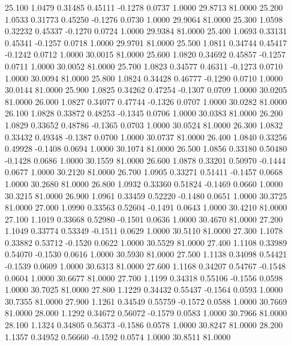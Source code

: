   25.100   1.0479   0.31485   0.45111  -0.1278   0.0737   1.0000  29.8713  81.0000
  25.200   1.0533   0.31773   0.45250  -0.1276   0.0730   1.0000  29.9064  81.0000
  25.300   1.0598   0.32232   0.45337  -0.1270   0.0724   1.0000  29.9384  81.0000
  25.400   1.0693   0.33131   0.45341  -0.1257   0.0718   1.0000  29.9701  81.0000
  25.500   1.0811   0.34744   0.45417  -0.1242   0.0712   1.0000  30.0015  81.0000
  25.600   1.0820   0.34692   0.45857  -0.1257   0.0711   1.0000  30.0052  81.0000
  25.700   1.0823   0.34577   0.46311  -0.1273   0.0710   1.0000  30.0094  81.0000
  25.800   1.0824   0.34428   0.46777  -0.1290   0.0710   1.0000  30.0144  81.0000
  25.900   1.0825   0.34262   0.47254  -0.1307   0.0709   1.0000  30.0205  81.0000
  26.000   1.0827   0.34077   0.47744  -0.1326   0.0707   1.0000  30.0282  81.0000
  26.100   1.0828   0.33872   0.48253  -0.1345   0.0706   1.0000  30.0383  81.0000
  26.200   1.0829   0.33652   0.48786  -0.1365   0.0703   1.0000  30.0524  81.0000
  26.300   1.0832   0.33432   0.49348  -0.1387   0.0700   1.0000  30.0737  81.0000
  26.400   1.0840   0.33256   0.49928  -0.1408   0.0694   1.0000  30.1074  81.0000
  26.500   1.0856   0.33180   0.50480  -0.1428   0.0686   1.0000  30.1559  81.0000
  26.600   1.0878   0.33201   0.50970  -0.1444   0.0677   1.0000  30.2120  81.0000
  26.700   1.0905   0.33271   0.51411  -0.1457   0.0668   1.0000  30.2680  81.0000
  26.800   1.0932   0.33360   0.51824  -0.1469   0.0660   1.0000  30.3215  81.0000
  26.900   1.0961   0.33459   0.52220  -0.1480   0.0651   1.0000  30.3725  81.0000
  27.000   1.0990   0.33563   0.52604  -0.1491   0.0643   1.0000  30.4210  81.0000
  27.100   1.1019   0.33668   0.52980  -0.1501   0.0636   1.0000  30.4670  81.0000
  27.200   1.1049   0.33774   0.53349  -0.1511   0.0629   1.0000  30.5110  81.0000
  27.300   1.1078   0.33882   0.53712  -0.1520   0.0622   1.0000  30.5529  81.0000
  27.400   1.1108   0.33989   0.54070  -0.1530   0.0616   1.0000  30.5930  81.0000
  27.500   1.1138   0.34098   0.54421  -0.1539   0.0609   1.0000  30.6313  81.0000
  27.600   1.1168   0.34207   0.54767  -0.1548   0.0604   1.0000  30.6677  81.0000
  27.700   1.1199   0.34318   0.55106  -0.1556   0.0598   1.0000  30.7025  81.0000
  27.800   1.1229   0.34432   0.55437  -0.1564   0.0593   1.0000  30.7355  81.0000
  27.900   1.1261   0.34549   0.55759  -0.1572   0.0588   1.0000  30.7669  81.0000
  28.000   1.1292   0.34672   0.56072  -0.1579   0.0583   1.0000  30.7966  81.0000
  28.100   1.1324   0.34805   0.56373  -0.1586   0.0578   1.0000  30.8247  81.0000
  28.200   1.1357   0.34952   0.56660  -0.1592   0.0574   1.0000  30.8511  81.0000
